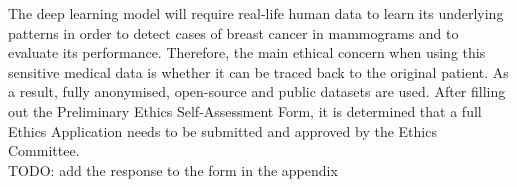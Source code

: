 The deep learning model will require real-life human data to learn its underlying patterns in order to detect cases of breast cancer in mammograms and to evaluate its performance. Therefore, the main ethical concern when using this sensitive medical data is whether it can be traced back to the original patient. As a result, fully anonymised, open-source and public datasets are used. After filling out the Preliminary Ethics Self-Assessment Form, it is determined that a full Ethics Application needs to be submitted and approved by the Ethics Committee.\\

TODO: add the response to the form in the appendix